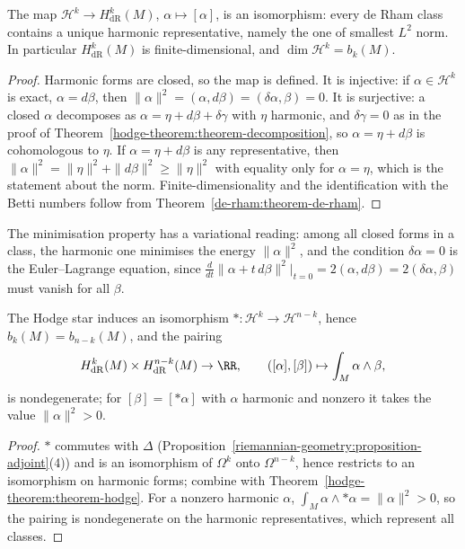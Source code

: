 \begin{theorem}[Hodge]\label{hodge-theorem:theorem-hodge}
The map $\mathcal{H}^k \to H^k_{\mathrm{dR}}(M)$, $\alpha \mapsto [\alpha]$, is an isomorphism: every de Rham class contains a unique harmonic representative, namely the one of smallest $L^2$ norm. In
particular $H^k_{\mathrm{dR}}(M)$ is finite-dimensional, and $\dim\mathcal{H}^k = b_k(M)$.
\end{theorem}

\begin{proof}
Harmonic forms are closed, so the map is defined. It is injective: if $\alpha \in \mathcal{H}^k$ is exact, $\alpha = d\beta$, then $\|\alpha\|^2 = (\alpha, d\beta) = (\delta\alpha, \beta) = 0$. It is surjective: a closed
$\alpha$ decomposes as $\alpha = \eta + d\beta + \delta\gamma$ with $\eta$ harmonic, and $\delta\gamma = 0$ as in the proof of Theorem~\ref{hodge-theorem:theorem-decomposition}, so $\alpha = \eta + d\beta$ is
cohomologous to $\eta$. If $\alpha = \eta + d\beta$ is any representative, then $\|\alpha\|^2 = \|\eta\|^2 + \|d\beta\|^2 \geq \|\eta\|^2$ with equality only for $\alpha = \eta$, which is the statement about the
norm. Finite-dimensionality and the identification with the Betti numbers follow from Theorem~\ref{de-rham:theorem-de-rham}.
\end{proof}

The minimisation property has a variational reading: among all closed forms in a class, the harmonic one minimises the energy $\|\alpha\|^2$, and the condition $\delta\alpha = 0$ is the
Euler--Lagrange equation, since $\frac{d}{dt}\|\alpha + t\,d\beta\|^2\big|_{t=0} = 2(\alpha, d\beta) = 2(\delta\alpha, \beta)$ must vanish for all $\beta$.

\begin{corollary}\label{hodge-theorem:corollary-poincare-duality}
The Hodge star induces an isomorphism $* \colon \mathcal{H}^k \to \mathcal{H}^{n-k}$, hence $b_k(M) = b_{n-k}(M)$, and the pairing
\[
H^k_{\mathrm{dR}}(M) \times H^{n-k}_{\mathrm{dR}}(M) \to \RR, \qquad ([\alpha], [\beta]) \mapsto \int_M\alpha \wedge \beta,
\]
is nondegenerate; for $[\beta] = [*\alpha]$ with $\alpha$ harmonic and nonzero it takes the value $\|\alpha\|^2 > 0$.
\end{corollary}

\begin{proof}
$*$ commutes with $\Delta$ (Proposition~\ref{riemannian-geometry:proposition-adjoint}(4)) and is an isomorphism of $\Omega^k$ onto $\Omega^{n-k}$, hence restricts to an isomorphism on harmonic forms; combine
with Theorem~\ref{hodge-theorem:theorem-hodge}. For a nonzero harmonic $\alpha$, $\int_M\alpha \wedge *\alpha = \|\alpha\|^2 > 0$, so the pairing is nondegenerate on the harmonic representatives, which represent
all classes.
\end{proof}

